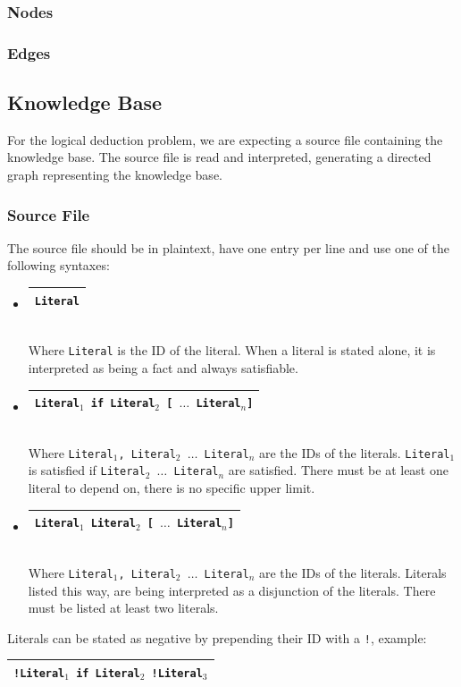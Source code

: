 \documentclass[11pt]{article}
\newcommand{\tbox}[1] {\begin{tabular}{| c |}\hline {#1} \\ \hline\end{tabular}}
\begin{document}
\subsubsection{Nodes}

\subsubsection{Edges}

\subsection{Knowledge Base}
For the logical deduction problem, we are expecting a source file containing the knowledge base. The source file is read and interpreted, generating a directed graph representing the knowledge base.

\subsubsection{Source File}
The source file should be in plaintext, have one entry per line and use one of the following syntaxes:
\begin{itemize}
	\item \tbox{\tt Literal}\\
	Where {\tt Literal} is the ID of the literal. When a literal is stated alone, it is interpreted as being a fact and always satisfiable.
	
	\item \tbox{\tt Literal$_1$ if Literal$_2$ [ $\ldots$ Literal$_n$]}\\
	Where {\tt Literal$_1$, Literal$_2$ $\ldots$ Literal$_n$} are the IDs of the literals. {\tt Literal$_1$} is satisfied if {\tt Literal$_2$ $\ldots$ Literal$_n$} are satisfied. There must be at least one literal to depend on, there is no specific upper limit.
	
	\item \tbox{\tt Literal$_1$ Literal$_2$  [ $\ldots$ Literal$_n$]}\\
	Where {\tt Literal$_1$, Literal$_2$ $\ldots$ Literal$_n$} are the IDs of the literals. Literals listed this way, are being interpreted as a disjunction of the literals. There must be listed at least two literals.
\end{itemize}

Literals can be stated as negative by prepending their ID with a {\tt !}, example:\\ \tbox{\tt !Literal$_1$ if Literal$_2$ !Literal$_3$}
\end{document}
